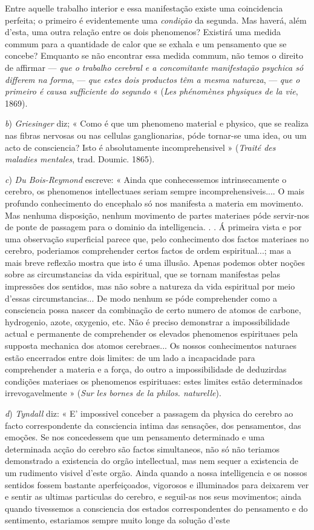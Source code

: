 Entre aquelle trabalho interior e essa manifestação existe uma coincidencia perfeita; o primeiro é evidentemente uma \emph{condição} da segunda. Mas haverá, além d'esta, uma outra relação entre os dois phenomenos? Existirá uma medida commum para a quantidade de calor que se exhala e um pensamento que se concebe? Emquanto se não encontrar essa medida commum, não temos o direito de affirmar --- \emph{que o trabalho cerebral e a concomitante manifestação psychica só differem na forma}, --- \emph{que estes dois productos têm a mesma natureza}, --- \emph{que o primeiro é causa sufficiente do segundo} « (\emph{Les phénomènes physiques de la vie}, 1869).\par \emph{b}) \emph{Griesinger} diz; « Como é que um phenomeno material e physico, que se realiza nas fibras nervosas ou nas cellulas ganglionarias, póde tornar-se uma idea, ou um acto de consciencia? Isto é absolutamente incomprehensivel » (\emph{Traité des maladies mentales}, trad. Doumic. 1865).\par \emph{c}) \emph{Du Bois-Reymond} escreve: « Ainda que conhecessemos intrinsecamente o cerebro, os phenomenos intellectuaes seriam sempre incomprehensiveis.... O mais profundo conhecimento do encephalo só nos manifesta a materia em movimento. Mas nenhuma disposição, nenhum movimento de partes materiaes póde servir-nos de ponte de passagem para o dominio da intelligencia. . . Á primeira vista e por uma observação superficial parece que, pelo conhecimento dos factos materiaes no cerebro, poderiamos comprehender certos factos de ordem espiritual...; mas a mais breve reflexão mostra que isto é uma illusão. Apenas podemos obter noções sobre as circumstancias da vida espiritual, que se tornam manifestas pelas impressões dos sentidos, mas não sobre a natureza da vida espiritual por meio d'essas circumstancias... De modo nenhum se póde comprehender como a consciencia possa nascer da combinação de certo numero de atomos de carbone, hydrogenio, azote, oxygenio, etc. Não é preciso demonstrar a impossibilidade actual e permanente de comprehender os elevados phenomenos espirituaes pela supposta mechanica dos atomos cerebraes... Os nossos conhecimentos naturaes estão encerrados entre dois limites: de um lado a incapacidade para comprehender a materia e a força, do outro a impossibilidade de deduzirdas condições materiaes os phenomenos espirituaes: estes limites estão determinados irrevogavelmente » (\emph{Sur les bornes de la philos. naturelle}).\par \emph{d}) \emph{Tyndall} diz: « E' impossivel conceber a passagem da physica do cerebro ao facto correspondente da consciencia intima das sensações, dos pensamentos, das emoções. Se nos concedessem que um pensamento determinado e uma determinada acção do cerebro são factos simultaneos, não só não teriamos demonstrado a existencia do orgão intellectual, mas nem sequer a existencia de um rudimento visivel d'este orgão. Ainda quando a nossa intelligencia e os nossos sentidos fossem bastante aperfeiçoados, vigorosos e illuminados para deixarem ver e sentir as ultimas particulas do cerebro, e seguil-as nos seus movimentos; ainda quando tivessemos a consciencia dos estados correspondentes do pensamento e do sentimento, estariamos sempre muito longe da solução d'este 